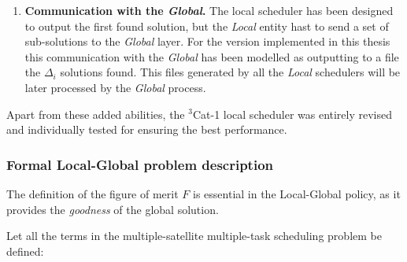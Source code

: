\begin{enumerate}
The figure of merit is the sole parameter of goodness information about each sub-solution that the \emph{Global} layer will receive. So, it is the unique information it has to obtain the optimal combination of sub-solutions. Instead of having an extensive knowledge of the resources available in each satellite, it only possesses the figure of merit's value. Because of that, the definition must be as complete as possible, containing all and only the variables that really characterize the sub-solution against any other one. $F$ is completely defined in section \ref{sec_F_LG}.

\item \textbf{Communication with the \emph{Global}.} The local scheduler has been designed to output the first found solution, but the \emph{Local} entity hast to send a set of sub-solutions to the \emph{Global} layer. %
For the version implemented in this thesis this communication with the \emph{Global} has been modelled as outputting to a file the $\Delta_i$ solutions found. This files generated by all the \emph{Local} schedulers will be later processed by the \emph{Global} process.

\end{enumerate}

Apart from these added abilities, the $^3$Cat-1 local scheduler was entirely revised and individually tested for ensuring the best performance.

\subsubsection{Formal Local-Global problem description}
\label{sec_F_LG}

The definition of the figure of merit $F$ is essential in the Local-Global policy, as it provides the \emph{goodness} of the global solution.

Let all the terms in the multiple-satellite multiple-task scheduling problem be defined:


